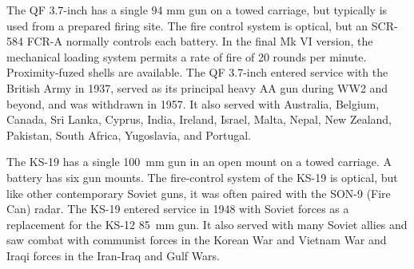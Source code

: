 \begin{withcounters}

    The QF 3.7-inch has a single 94 mm gun on a towed carriage, but typically is used from a prepared firing site.
    The fire control system is optical, but an SCR-584 FCR-A normally controls each battery.
    In the final Mk VI version, the mechanical loading system permits a rate of fire of 20 rounds per minute.
    Proximity-fuzed shells are available.
    The QF 3.7-inch entered service with the British Army in 1937, served as its principal heavy AA gun during WW2 and beyond, and was withdrawn in 1957. It also served with Australia, Belgium, Canada, Sri Lanka, Cyprus, India, Ireland, Israel, Malta, Nepal, New Zealand, Pakistan, South Africa, Yugoslavia, and Portugal.%


    The KS-19 has a single 100~mm gun in an open mount on a towed carriage.
    A battery has six gun mounts.
    The fire-control system of the KS-19 is optical, but like other contemporary Soviet guns, it was often paired with the SON-9 (Fire Can) radar.
    The KS-19 entered service in 1948 with Soviet forces as a replacement for the KS-12 85~mm gun. It also served with many Soviet allies and saw combat with communist forces in the Korean War and Vietnam War and Iraqi forces in the Iran-Iraq and Gulf Wars.%
\end{withcounters}
